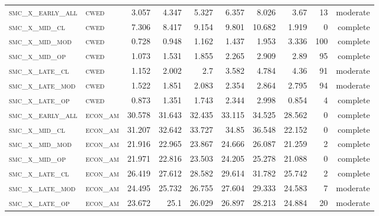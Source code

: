 \begin{landscape}
\begin{center}
\begin{footnotesize}
\begin{longtable}{llrrrrr|rrr}
\textsc{smc\_x\_early\_all} & \textsc{cwed      }   & 3.057      & 4.347      & 5.327      & 6.357      & 8.026      & 3.67       & 13    & moderate   \\
\textsc{smc\_x\_mid\_cl   } & \textsc{cwed      }   & 7.306      & 8.417      & 9.154      & 9.801      & 10.682     & 1.919      & 0     & complete   \\
\textsc{smc\_x\_mid\_mod  } & \textsc{cwed      }   & 0.728      & 0.948      & 1.162      & 1.437      & 1.953      & 3.336      & 100   & complete   \\
\textsc{smc\_x\_mid\_op   } & \textsc{cwed      }   & 1.073      & 1.531      & 1.855      & 2.265      & 2.909      & 2.89       & 95    & complete   \\
\textsc{smc\_x\_late\_cl  } & \textsc{cwed      }   & 1.152      & 2.002      & 2.7        & 3.582      & 4.784      & 4.36       & 91    & moderate   \\
\textsc{smc\_x\_late\_mod } & \textsc{cwed      }   & 1.522      & 1.851      & 2.083      & 2.354      & 2.864      & 2.795      & 94    & moderate   \\
\textsc{smc\_x\_late\_op  } & \textsc{cwed      }   & 0.873      & 1.351      & 1.743      & 2.344      & 2.998      & 0.854      & 4     & complete   \\
\textsc{smc\_x\_early\_all} & \textsc{econ\_am  }   & 30.578     & 31.643     & 32.435     & 33.115     & 34.525     & 28.562     & 0     & complete   \\
\textsc{smc\_x\_mid\_cl   } & \textsc{econ\_am  }   & 31.207     & 32.642     & 33.727     & 34.85      & 36.548     & 22.152     & 0     & complete   \\
\textsc{smc\_x\_mid\_mod  } & \textsc{econ\_am  }   & 21.916     & 22.965     & 23.867     & 24.666     & 26.087     & 21.259     & 2     & complete   \\
\textsc{smc\_x\_mid\_op   } & \textsc{econ\_am  }   & 21.971     & 22.816     & 23.503     & 24.205     & 25.278     & 21.088     & 0     & complete   \\
\textsc{smc\_x\_late\_cl  } & \textsc{econ\_am  }   & 26.419     & 27.612     & 28.582     & 29.614     & 31.782     & 25.742     & 2     & complete   \\
\textsc{smc\_x\_late\_mod } & \textsc{econ\_am  }   & 24.495     & 25.732     & 26.755     & 27.604     & 29.333     & 24.583     & 7     & moderate   \\
\textsc{smc\_x\_late\_op  } & \textsc{econ\_am  }   & 23.672     & 25.1       & 26.029     & 26.897     & 28.213     & 24.884     & 20    & moderate   \\

\end{longtable}
\end{footnotesize}
\end{center}
\end{landscape}
